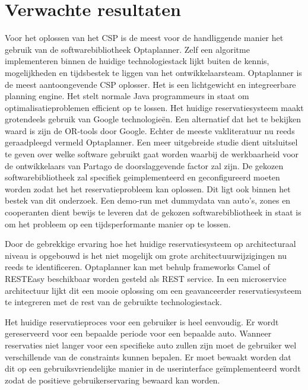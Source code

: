 \section{Verwachte resultaten}
\label{sec:verwachte_resultaten}
Voor het oplossen van het CSP is de meest voor de handliggende manier het gebruik van de softwarebibliotheek Optaplanner. Zelf een algoritme implementeren binnen de huidige technologiestack lijkt buiten de kennis, mogelijkheden en tijdsbestek te liggen van het ontwikkelaarsteam.
Optaplanner is de meest aantoongevende CSP oplosser. Het is een lichtgewicht en integreerbare planning engine. Het stelt normale Java programmeurs in staat om optimalisatieproblemen efficient op te lossen. \autocite{optaplanner} Het huidige reservatiesysteem maakt grotendeels gebruik van Google technologieën. Een alternatief dat het te bekijken waard is zijn de OR-tools door Google. \autocite{ortools} Echter de meeste vakliteratuur nu reeds geraadpleegd vermeld Optaplanner. Een meer uitgebreide studie dient uitsluitsel te geven over welke software gebruikt gaat worden waarbij de werkbaarheid voor de ontwikkelaars van Partago de doorslaggevende factor zal zijn. De gekozen softwarebibliotheek zal specifiek geimplementeerd en geconfigureerd moeten worden zodat het het reservatieprobleem kan oplossen. Dit ligt ook binnen het bestek van dit onderzoek. Een demo-run met dummydata van auto's, zones en cooperanten dient bewijs te leveren dat de gekozen softwarebibliotheek in staat is om het probleem op een tijdsperformante manier op te lossen. 

Door de gebrekkige ervaring hoe het huidige reservatiesysteem op architecturaal niveau is opgebouwd is het niet mogelijk om grote architectuurwijzigingen nu reeds te identificeren. Optaplanner kan met behulp frameworks Camel of RESTEasy beschikbaar worden gesteld als REST service. \autocite{manualoptaplanner} In een microservice architectuur lijkt dit een mooie oplossing om een geavanceerder reservatiesysteem te integreren met de rest van de gebruikte technologiestack.

Het huidige reservatieproces voor een gebruiker is heel eenvoudig. Er wordt gereserveerd voor een bepaalde periode voor een bepaalde auto. Wanneer reservaties niet langer voor een specifieke auto zullen zijn moet de gebruiker wel verschillende van de constraints kunnen bepalen. Er moet bewaakt worden dat dit op een gebruiksvriendelijke manier in de userinterface geïmplementeerd wordt zodat de positieve gebruikerservaring bewaard kan worden.


